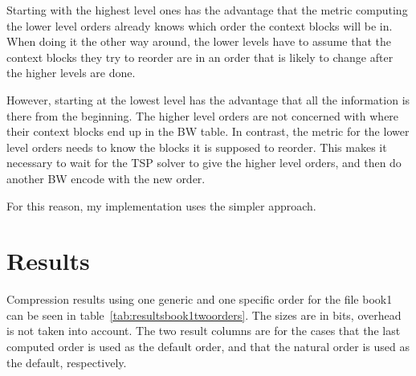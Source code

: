 \documentclass[a4paper]{scrreprt}
\begin{document}
Starting with the highest level ones has the advantage that the metric
computing the lower level orders already knows which order the context blocks
will be in.
When doing it the other way around, the lower levels have to assume that the
context blocks they try to reorder are in an order that is likely to change
after the higher levels are done.

However, starting at the lowest level has the advantage that all the information
is there from the beginning. The higher level orders are not concerned with
where their context blocks end up in the BW table. In contrast, the metric for
the lower level orders needs to know the blocks it is supposed to reorder. This
makes it necessary to wait for the TSP solver to give the higher level orders,
and then do another BW encode with the new order.

For this reason, my implementation uses the simpler approach.

\section{Results}

Compression results using one generic and one specific order for the file book1
can be seen in table~\ref{tab:resultsbook1twoorders}. The sizes are in bits,
overhead is not taken into account. The two result columns are for the cases
that the last computed order is used as the default order, and that the natural
order is used as the default, respectively.
\end{document}
